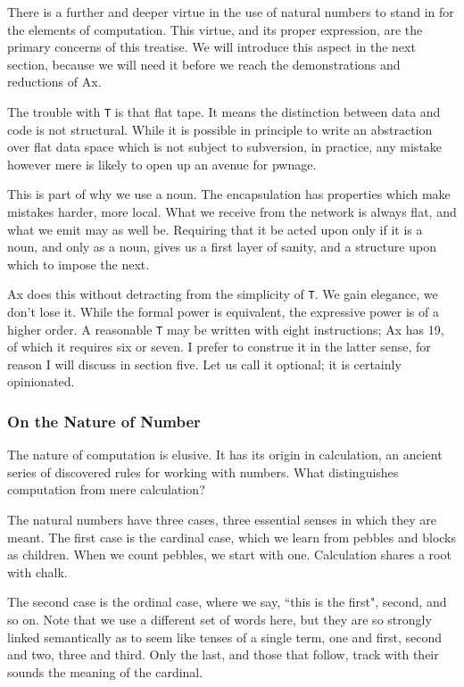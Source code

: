 \documentclass[twoside]{article}
\begin{document}
There is a further and deeper virtue in the use of natural numbers to stand in for the elements of computation. This virtue, and its proper expression, are the primary concerns of this treatise. We will introduce this aspect in the next section, because we will need it before we reach the demonstrations and reductions of Ax.

The trouble with \texttt{T} is that flat tape. It means the distinction between data and code is not structural. While it is possible in principle to write an abstraction over flat data space which is not subject to subversion, in practice, any mistake however mere is likely to open up an avenue for pwnage.

This is part of why we use a noun. The encapsulation has properties which make mistakes harder, more local. What we receive from the network is always flat, and what we emit may as well be. Requiring that it be acted upon only if it is a noun, and only as a noun, gives us a first layer of sanity, and a structure upon which to impose the next.

Ax does this without detracting from the simplicity of \texttt{T}. We gain elegance, we don't lose it. While the formal power is equivalent, the expressive power is of a higher order. A reasonable \texttt{T} may be written with eight instructions; Ax has 19, of which it requires six or seven. I prefer to construe it in the latter sense, for reason I will discuss in section five. Let us call it optional; it is certainly opinionated.

\subsubsection{On the Nature of Number}

The nature of computation is elusive. It has its origin in calculation, an ancient series of discovered rules for working with numbers. What distinguishes computation from mere calculation?

The natural numbers have three cases, three essential senses in which they are meant. The first case is the cardinal case, which we learn from pebbles and blocks as children. When we count pebbles, we start with one. Calculation shares a root with chalk.

The second case is the ordinal case, where we say, ``this is the first", second, and so on. Note that we use a different set of words here, but they are so strongly linked semantically as to seem like tenses of a single term, one and first, second and two, three and third. Only the last, and those that follow, track with their sounds the meaning of the cardinal.
\end{document}
